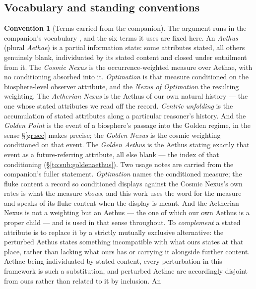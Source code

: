 \documentclass[11pt]{article}
\numberwithin{equation}{section}
\theoremstyle{plain}
\theoremstyle{definition}
\newtheorem{convention}[theorem]{Convention}
\theoremstyle{remark}
\begin{document}
\subsection{Vocabulary and standing conventions}\label{gc:sub:vocab}

\begin{convention}[Terms carried from the companion]\label{gc:conv:vocab}
The argument runs in the companion's vocabulary
\cite{Nexus, Ben26Found}, and the six terms it uses are fixed here.
An \emph{Aethus} (plural \emph{Aethae}) is a partial information state:
some attributes stated, all others genuinely blank, individuated by its
stated content and closed under entailment from it. The \emph{Cosmic
Nexus} is the occurrence-weighted measure over Aethae, with no
conditioning absorbed into it. \emph{Optimation} is that measure
conditioned on the biosphere-level observer attribute, and the
\emph{Nexus of Optimation} the resulting weighting. The
\emph{Aetherian Nexus} is the Aethus of our own natural history ---
the one whose stated attributes we read off the record. \emph{Centric
unfolding} is the accumulation of stated attributes along a
particular reasoner's history. And the \emph{Golden Point} is the event
of a biosphere's passage into the Golden regime, in the sense
\S\ref{gr:sec} makes precise; the \emph{Golden Nexus} is the cosmic
weighting conditioned on that event. The \emph{Golden Aethus} is the
Aethus stating exactly that event as a future-referring attribute, all
else blank --- the index of that conditioning
(\S\ref{to:sub:goldenaethus}).
Two usage notes are carried from the companion's fuller statement.
\emph{Optimation} names the conditioned measure; the fluke content a
record so conditioned displays against the Cosmic Nexus's own rates is
what the measure \emph{shows}, and this work uses the word for the
measure and speaks of its fluke content when the display is meant. And
the Aetherian Nexus is not a weighting but an Aethus --- the one of
which our own Aethus is a proper child --- and is used in that sense
throughout.
To \emph{complement} a stated attribute is to replace it by a
strictly mutually exclusive alternative: the perturbed Aethus states
something incompatible with what ours states at that place, rather than
lacking what ours has or carrying it alongside further content. Aethae
being individuated by stated content, every perturbation in this
framework is such a substitution, and perturbed Aethae are accordingly
disjoint from ours rather than related to it by inclusion. An

\end{convention}
\end{document}
